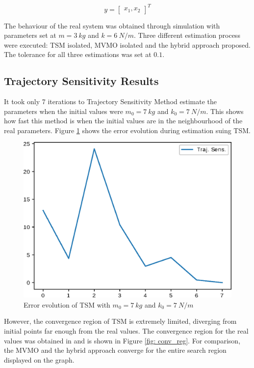 \begin{equation}
	y = \begin{bmatrix}
		x_{1}, x_{2}
	\end{bmatrix}^ {T}
\end{equation}

The behaviour of the real system was obtained through simulation with parameters set at $m = 3\ kg$ and $k = 6\ N/m$. Three different estimation process were executed: TSM isolated, MVMO isolated and the hybrid approach proposed. The tolerance for all three estimations was set at $0.1$.

\subsection{Trajectory Sensitivity Results}

It took only 7 iterations to Trajectory Sensitivity Method estimate the parameters when the initial values were $m_{0} = 7\ kg$ and $k_{0} = 7\ N/m$. This shows how fast this method is when the initial values are in the neighbourhood of the real parameters. Figure \ref{fig: TS_conv} shows the error evolution during estimation suing TSM.

\begin{figure}[h]
	\caption{Error evolution of TSM with $m_{0} = 7\ kg$ and $k_{0} = 7\ N/m$}
	\begin{center}
		\includegraphics[scale=0.7]{Images/TS_conv.eps}
	\end{center}
	\label{fig: TS_conv}
\end{figure}

However, the convergence region of TSM is extremely limited, diverging from initial points far enough from the real values. The convergence region for the real values was obtained in \cite{Ecyo} and is shown in Figure \ref{fig: conv_reg}. For comparison, the MVMO and the hybrid approach converge for the entire search region displayed on the graph.

